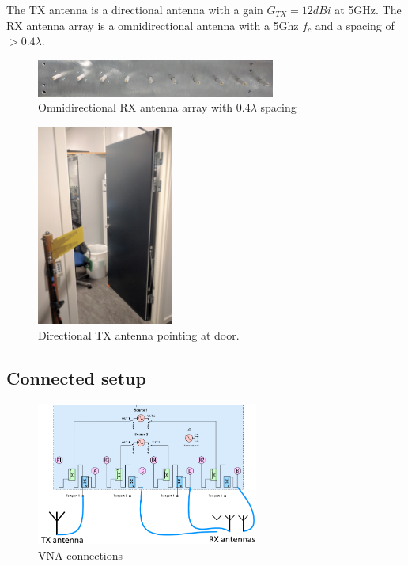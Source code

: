 The TX antenna is a directional antenna with a gain $G_{TX}=12dBi$ at 5GHz.
The RX antenna array is a omnidirectional antenna with a 5Ghz $f_c$ and a spacing of $>0.4 \lambda$.
\begin{figure}[H]
\centering
\includegraphics[width=0.7\textwidth]{pictures/Measurement/antenna_array.jpg}
    \caption{Omnidirectional RX antenna array with $0.4 \lambda$ spacing}
\end{figure}
\begin{figure}[H]
\centering
\includegraphics[width=0.4\textwidth]{pictures/Measurement/antenna_door.jpg}
\caption{Directional TX antenna pointing at door.}
\end{figure}



\subsection{Connected setup}
\label{connected_setup}

\begin{figure}[H]
\centering
\includegraphics[width=0.65\textwidth]{figures/Gimp_figures/4portVNA.png}
\caption{VNA connections}
\label{connection_diagram}
\end{figure}

